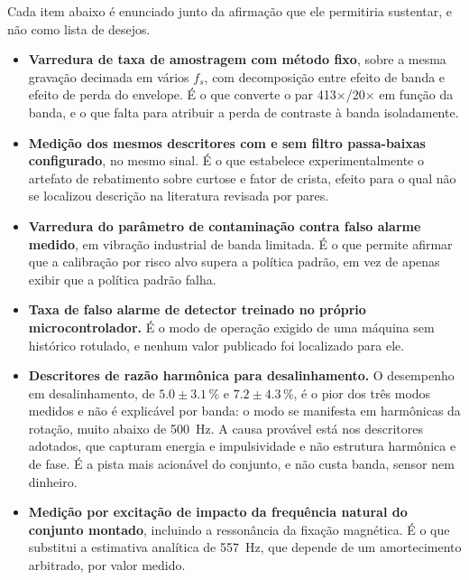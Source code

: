 Cada item abaixo é enunciado junto da afirmação que ele permitiria sustentar, e não como
lista de desejos.

\begin{itemize}
    \item \textbf{Varredura de taxa de amostragem com método fixo}, sobre a mesma gravação
          decimada em vários $f_s$, com decomposição entre efeito de banda e efeito de
          perda do envelope. É o que converte o par \num{413}$\times$/\num{20}$\times$ em
          função da banda, e o que falta para atribuir a perda de contraste à banda
          isoladamente.

    \item \textbf{Medição dos mesmos descritores com e sem filtro passa-baixas
          configurado}, no mesmo sinal. É o que estabelece experimentalmente o artefato de
          rebatimento sobre curtose e fator de crista, efeito para o qual não se localizou
          descrição na literatura revisada por pares.

    \item \textbf{Varredura do parâmetro de contaminação contra falso alarme medido}, em
          vibração industrial de banda limitada. É o que permite afirmar que a calibração
          por risco alvo supera a política padrão, em vez de apenas exibir que a política
          padrão falha.

    \item \textbf{Taxa de falso alarme de detector treinado no próprio microcontrolador.}
          É o modo de operação exigido de uma máquina sem histórico rotulado, e nenhum
          valor publicado foi localizado para ele.

    \item \textbf{Descritores de razão harmônica para desalinhamento.} O desempenho em
          desalinhamento, de $\num{5,0} \pm \num{3,1}\,\si{\percent}$ e
          $\num{7,2} \pm \num{4,3}\,\si{\percent}$, é o pior dos três modos
          medidos e não é explicável por banda: o modo se manifesta em harmônicas da
          rotação, muito abaixo de \SI{500}{\hertz}. A causa provável está nos descritores
          adotados, que capturam energia e impulsividade e não estrutura harmônica e de
          fase. É a pista mais acionável do conjunto, e não custa banda, sensor nem
          dinheiro.

    \item \textbf{Medição por excitação de impacto da frequência natural do conjunto
          montado}, incluindo a ressonância da fixação magnética. É o que substitui a
          estimativa analítica de \SI{557}{\hertz}, que depende de um amortecimento
          arbitrado, por valor medido.


\end{itemize}
